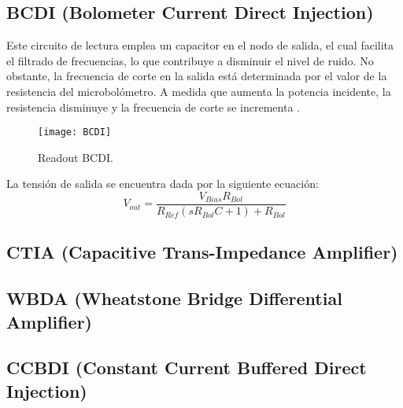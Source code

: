 \subsection{BCDI (Bolometer Current Direct Injection)}
Este circuito de lectura emplea un capacitor en el nodo de salida, el cual facilita el filtrado de frecuencias, lo que contribuye a disminuir el nivel de ruido. No obstante, la frecuencia de corte en la salida está determinada por el valor de la resistencia del microbolómetro. A medida que aumenta la potencia incidente, la resistencia disminuye y la frecuencia de corte se incrementa \cite{BlancoMDA}.
            \begin{figure}[hbtp]
                \centering
                \texttt{[image: BCDI]}
                \caption{Readout BCDI.}
                \label{fig:BCDI}
            \end{figure}
\newpage
La tensión de salida se encuentra dada por la siguiente ecuación:
        \begin{equation}
        V_{out} =\frac{V_{Bias} R_{Bol}}{R_{Ref} (sR_{Bol} C+1) + R_{Bol}}
        \label{eq:bcdi}
        \end{equation}
\subsection{CTIA (Capacitive Trans-Impedance Amplifier)}
\subsection{WBDA (Wheatstone Bridge Differential Amplifier)}
\subsection{CCBDI (Constant Current Buffered Direct Injection)}